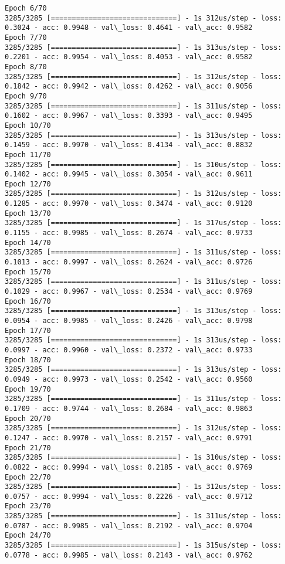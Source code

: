 \documentclass[11pt]{article}
\begin{document}
\begin{Verbatim}[commandchars=\\\{\}]
Epoch 6/70
3285/3285 [==============================] - 1s 312us/step - loss: 0.3024 - acc: 0.9948 - val\_loss: 0.4641 - val\_acc: 0.9582
Epoch 7/70
3285/3285 [==============================] - 1s 313us/step - loss: 0.2201 - acc: 0.9954 - val\_loss: 0.4053 - val\_acc: 0.9582
Epoch 8/70
3285/3285 [==============================] - 1s 312us/step - loss: 0.1842 - acc: 0.9942 - val\_loss: 0.4262 - val\_acc: 0.9056
Epoch 9/70
3285/3285 [==============================] - 1s 311us/step - loss: 0.1602 - acc: 0.9967 - val\_loss: 0.3393 - val\_acc: 0.9495
Epoch 10/70
3285/3285 [==============================] - 1s 313us/step - loss: 0.1459 - acc: 0.9970 - val\_loss: 0.4134 - val\_acc: 0.8832
Epoch 11/70
3285/3285 [==============================] - 1s 310us/step - loss: 0.1402 - acc: 0.9945 - val\_loss: 0.3054 - val\_acc: 0.9611
Epoch 12/70
3285/3285 [==============================] - 1s 312us/step - loss: 0.1285 - acc: 0.9970 - val\_loss: 0.3474 - val\_acc: 0.9120
Epoch 13/70
3285/3285 [==============================] - 1s 317us/step - loss: 0.1155 - acc: 0.9985 - val\_loss: 0.2674 - val\_acc: 0.9733
Epoch 14/70
3285/3285 [==============================] - 1s 311us/step - loss: 0.1013 - acc: 0.9997 - val\_loss: 0.2624 - val\_acc: 0.9726
Epoch 15/70
3285/3285 [==============================] - 1s 311us/step - loss: 0.1029 - acc: 0.9967 - val\_loss: 0.2534 - val\_acc: 0.9769
Epoch 16/70
3285/3285 [==============================] - 1s 313us/step - loss: 0.0954 - acc: 0.9985 - val\_loss: 0.2426 - val\_acc: 0.9798
Epoch 17/70
3285/3285 [==============================] - 1s 313us/step - loss: 0.0997 - acc: 0.9960 - val\_loss: 0.2372 - val\_acc: 0.9733
Epoch 18/70
3285/3285 [==============================] - 1s 313us/step - loss: 0.0949 - acc: 0.9973 - val\_loss: 0.2542 - val\_acc: 0.9560
Epoch 19/70
3285/3285 [==============================] - 1s 311us/step - loss: 0.1709 - acc: 0.9744 - val\_loss: 0.2684 - val\_acc: 0.9863
Epoch 20/70
3285/3285 [==============================] - 1s 312us/step - loss: 0.1247 - acc: 0.9970 - val\_loss: 0.2157 - val\_acc: 0.9791
Epoch 21/70
3285/3285 [==============================] - 1s 310us/step - loss: 0.0822 - acc: 0.9994 - val\_loss: 0.2185 - val\_acc: 0.9769
Epoch 22/70
3285/3285 [==============================] - 1s 312us/step - loss: 0.0757 - acc: 0.9994 - val\_loss: 0.2226 - val\_acc: 0.9712
Epoch 23/70
3285/3285 [==============================] - 1s 311us/step - loss: 0.0787 - acc: 0.9985 - val\_loss: 0.2192 - val\_acc: 0.9704
Epoch 24/70
3285/3285 [==============================] - 1s 315us/step - loss: 0.0778 - acc: 0.9985 - val\_loss: 0.2143 - val\_acc: 0.9762

\end{Verbatim}
\end{document}
